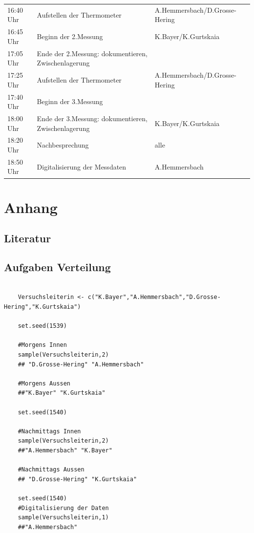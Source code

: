 \documentclass[ ngerman, fontsize= 12pt, paper=a4, headings=big, titlepage=true]{article}
\begin{document}
\begin{table}[h]
\begin{tabular}{l|l|l}
			16:40 Uhr	&	Aufstellen der Thermometer						&A.Hemmersbach/D.Grosse-Hering\\
			16:45 Uhr	&	Beginn der 2.Messung							&K.Bayer/K.Gurtskaia\\
			17:05 Uhr	& 	Ende der 2.Messung: dokumentieren, Zwischenlagerung &\\
			
			17:25 Uhr	&	Aufstellen der Thermometer						&A.Hemmersbach/D.Grosse-Hering\\
			17:40 Uhr	&	Beginn der 3.Messung							& \\
			18:00 Uhr	& 	Ende der 3.Messung: dokumentieren, Zwischenlagerung & K.Bayer/K.Gurtskaia\\
			
			\hline
			
			18:20 Uhr	&	Nachbesprechung									& alle \\
			18:50 Uhr	& 	Digitalisierung der Messdaten					&A.Hemmersbach\\
			
			
		\end{tabular}
	\end{table}
	\newpage
	
	\newpage
	
	\renewcommand{\thesubsection}{\Alph{subsection}}
	
	
	\section{Anhang}
	
	\subsection{Literatur}
	\printbibliography[heading=none]
	\vspace{1cm}
	
	\subsection{Aufgaben Verteilung} \label{Verteilung}
	
	
	\begin{lstlisting}
		
    Versuchsleiterin <- c("K.Bayer","A.Hemmersbach","D.Grosse-Hering","K.Gurtskaia")
		
    set.seed(1539)

    #Morgens Innen
    sample(Versuchsleiterin,2)
    ## "D.Grosse-Hering" "A.Hemmersbach" 
		
    #Morgens Aussen
    ##"K.Bayer" "K.Gurtskaia"
		
    set.seed(1540)
		
    #Nachmittags Innen
    sample(Versuchsleiterin,2)
    ##"A.Hemmersbach" "K.Bayer"
		
    #Nachmittags Aussen
    ## "D.Grosse-Hering" "K.Gurtskaia"
		
    set.seed(1540)
    #Digitalisierung der Daten
    sample(Versuchsleiterin,1)
    ##"A.Hemmersbach"
	\end{lstlisting}
	
\end{document}
